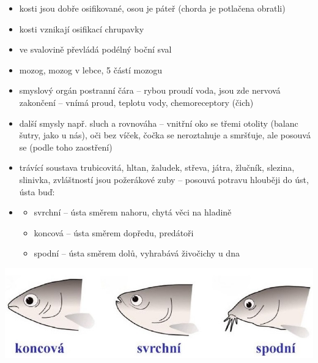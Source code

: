 \documentclass{article}
\begin{document}
\begin{itemize}
  \item kosti jsou dobře osifikované, osou je páteř (chorda je potlačena obratli)
  \item kosti vznikají osifikací chrupavky
  \item ve svalovině převládá podélný boční sval
  \item mozog, mozog v lebce, 5 částí mozogu
  \item smyslový orgán postranní čára -- rybou proudí voda, jsou zde nervová zakončení -- vnímá proud, teplotu vody, chemoreceptory (čich)
  \item další smysly např. sluch a rovnováha -- vnitřní oko se třemi otolity (balanc šutry, jako u nás), oči bez víček, čočka se neroztahuje a smršťuje, ale posouvá se (podle toho zaostření)
\end{itemize}
\begin{minipage}{\textwidth}
  \begin{itemize}
    \item trávící soustava trubicovitá, hltan, žaludek, střeva, játra, žlučník, slezina, slinivka, zvláštností jsou požerákové zuby -- posouvá potravu hlouběji do úst, ústa buď:
  \end{itemize}
\end{minipage}
\begin{minipage}{0.62\textwidth}\raggedleft
  \begin{itemize}
    \item[]
    \begin{itemize}
      \item svrchní -- ústa směrem nahoru, chytá věci na hladině
      \item koncová -- ústa směrem dopředu, predátoři
      \item spodní -- ústa směrem dolů, vyhrabává živočichy u dna
    \end{itemize}
  \end{itemize}
\end{minipage}
\hfill
\noindent\begin{minipage}{0.38\textwidth}
    \includegraphics[width=\linewidth]{rybi_huby}
\end{minipage}
\end{document}
